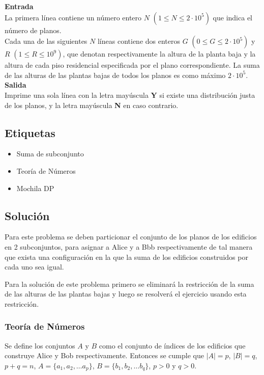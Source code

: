 \documentclass{article}
\begin{document}
\textbf{Entrada}\\

La primera línea contiene un número entero $N$ $(1\leq N\leq 2\cdot 10^5)$ que indica el número de planos.\\

Cada una de las siguientes $N$ líneas contiene dos enteros $G$ $(0\leq G\leq 2\cdot 10^5)$ y $R$ $(1\leq R\leq 10^9)$, que denotan respectivamente la altura de la planta baja y la altura de cada piso residencial especificada por el plano correspondiente. La suma de las alturas de las plantas bajas de todos los planos es como máximo $2\cdot 10^5$.\\

\textbf{Salida}\\

Imprime una sola línea con la letra mayúscula \textbf{Y} si existe una distribución justa de los planos, y la letra mayúscula \textbf{N} en caso contrario.

\subsection{Etiquetas}

\begin{itemize}
    \item Suma de subconjunto
    \item Teoría de Números
    \item Mochila DP
\end{itemize}

\subsection{Solución}

Para este problema se deben particionar el conjunto de los planos de los edificios en 2 subconjuntos, para asignar a Alice y a Bbb
respectivamente de tal manera que exista una configuración en la que la suma de los edificios construidos por cada uno sea igual.

Para la solución de este problema primero se eliminará la restricción de la suma de las alturas de las plantas bajas y luego
se resolverá el ejercicio usando esta restricción.

\subsubsection{Teoría de Números}

Se define los conjuntos $A$ y $B$ como el conjunto de índices de los edificios que construye Alice y Bob respectivamente. Entonces
se cumple que $|A|=p$, $|B|=q$, $p+q=n$, $A=\{ a_1, a_2, \ldots a_p\}$, $B=\{ b_1, b_2, \ldots b_q\}$, $p>0$ y $q>0$.
\end{document}
